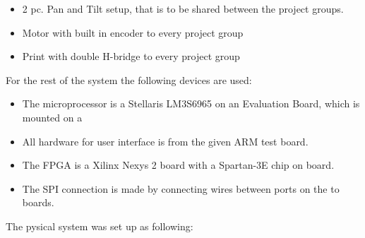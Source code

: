 \begin{itemize}
\item 2 pc. Pan and Tilt setup, that is to be shared between the project groups.
\item Motor with built in encoder to every project group
\item Print with double H-bridge to every project group
\end{itemize}

For the rest of the system the following devices are used:

\begin{itemize}
\item The microprocessor is a Stellaris LM3S6965 on an Evaluation Board, which is mounted on a
\item All hardware for user interface is from the given ARM test board.
\item The FPGA is a Xilinx Nexys 2 board with a Spartan-3E chip on board.
\item The SPI connection is made by connecting wires between ports on the to boards.
\end{itemize}

The pysical system was set up as following:

